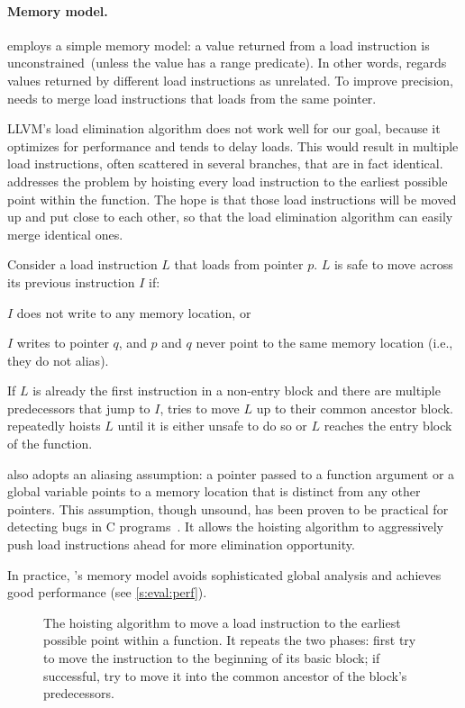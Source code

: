 \paragraph{Memory model.}
\sys employs a simple memory model: a value returned from a load
instruction is unconstrained~(unless the value has a range predicate).
%
In other words, \sys regards values returned by different load
instructions as unrelated.
To improve precision, \sys needs to merge load instructions that
loads from the same pointer.

LLVM's load elimination algorithm does not work well for our goal,
because it optimizes for performance and tends to delay loads.
This would result in multiple load instructions, 
often scattered in several branches, that are in fact identical.
%
\sys addresses the problem by hoisting every load instruction to
the earliest possible point within the function.  The hope is that
those load instructions will be moved up and put close to each
other, so that the load elimination algorithm can easily merge
identical ones.

Consider a load instruction $L$ that loads from pointer $p$.  $L$ is
safe to move across its previous instruction $I$ if:
\begin{CompactItemize}
\item $I$ does not write to any memory location, or
\item $I$ writes to pointer $q$, and $p$ and $q$ never point to the
same memory location (i.e., they do not alias).
\end{CompactItemize}

If $L$ is already the first instruction in a non-entry block and
there are multiple predecessors that jump to $I$, \sys tries to
move $L$ up to their common ancestor block.  \sys repeatedly hoists $L$
until it is either unsafe to do so or $L$ reaches the entry block of the
function.

\sys also adopts an aliasing assumption: a pointer passed to a
function argument or a global variable points to a memory location
that is distinct from any other pointers.  This assumption,
though unsound, has been proven to be practical for detecting bugs
in C programs~\cite{livshits:ipssa}.  It allows the hoisting algorithm
to aggressively push load instructions ahead for more elimination
opportunity.  

In practice, \sys's memory model avoids sophisticated global
analysis and achieves good performance (see \autoref{s:eval:perf}).

\begin{figure}

\caption{The hoisting algorithm to move a load instruction to the
earliest possible point within a function.  It repeats the two
phases: first try to move the instruction to the beginning of its
basic block; if successful, try to move it into the common ancestor
of the block's predecessors.}
\label{f:hoist}
\end{figure}
\fi

